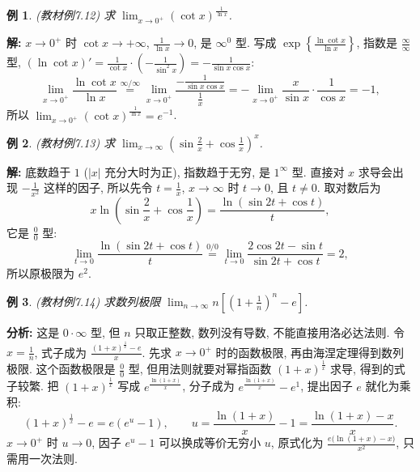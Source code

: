 \documentclass[UTF8,openany]{ctexbook}
\theoremstyle{chinesetextbook}
\newtheorem{example}{例}[section]
\newenvironment{cnsolution}{\par\indent\textbf{解:} \ignorespaces}{\par}
\begin{document}
\begin{example}\label{ex:c2-7-12}
\textnormal{(教材例7.12)} 求 $\displaystyle\lim_{x\to0^+}(\cot x)^{\frac1{\ln x}}$.
\end{example}
\begin{cnsolution}
$x\to0^+$ 时 $\cot x\to+\infty$, $\displaystyle\frac1{\ln x}\to0$, 是 $\infty^0$ 型. 写成 $\displaystyle\exp\left\{\frac{\ln\cot x}{\ln x}\right\}$, 指数是 $\displaystyle\frac\infty\infty$ 型, $\displaystyle(\ln\cot x)'=\frac1{\cot x}\cdot\left(-\frac1{\sin^2x}\right)=-\frac1{\sin x\cos x}$:
\[
\lim_{x\to0^+}\frac{\ln\cot x}{\ln x}\overset{\infty/\infty}{=}\lim_{x\to0^+}\frac{-\frac1{\sin x\cos x}}{\frac1x}=-\lim_{x\to0^+}\frac x{\sin x}\cdot\frac1{\cos x}=-1,
\]
所以 $\displaystyle\lim_{x\to0^+}(\cot x)^{\frac1{\ln x}}=e^{-1}$.
\end{cnsolution}
\begin{example}\label{ex:c2-7-13}
\textnormal{(教材例7.13)} 求 $\displaystyle\lim_{x\to\infty}\left(\sin\frac2x+\cos\frac1x\right)^x$.
\end{example}
\begin{cnsolution}
底数趋于 $1$ ($|x|$ 充分大时为正), 指数趋于无穷, 是 $1^\infty$ 型. 直接对 $x$ 求导会出现 $\displaystyle-\frac1{x^2}$ 这样的因子, 所以先令 $\displaystyle t=\frac1x$, $x\to\infty$ 时 $t\to0$, 且 $t\ne0$. 取对数后为
\[
x\ln\left(\sin\frac2x+\cos\frac1x\right)=\frac{\ln(\sin2t+\cos t)}t,
\]
它是 $\displaystyle\frac00$ 型:
\[
\lim_{t\to0}\frac{\ln(\sin2t+\cos t)}t\overset{0/0}{=}\lim_{t\to0}\frac{2\cos2t-\sin t}{\sin2t+\cos t}=2,
\]
所以原极限为 $e^2$.
\end{cnsolution}
\begin{example}\label{ex:c2-7-14}
\textnormal{(教材例7.14)} 求数列极限 $\displaystyle\lim_{n\to\infty}n\left[\left(1+\frac1n\right)^n-e\right]$.
\end{example}
\par\indent\textbf{分析:} 这是 $0\cdot\infty$ 型, 但 $n$ 只取正整数, 数列没有导数, 不能直接用洛必达法则. 令 $\displaystyle x=\frac1n$, 式子成为 $\displaystyle\frac{(1+x)^{\frac1x}-e}x$. 先求 $x\to0^+$ 时的函数极限, 再由海涅定理得到数列极限. 这个函数极限是 $\displaystyle\frac00$ 型, 但用法则就要对幂指函数 $(1+x)^{\frac1x}$ 求导, 得到的式子较繁. 把 $(1+x)^{\frac1x}$ 写成 $e^{\frac{\ln(1+x)}x}$, 分子成为 $e^{\frac{\ln(1+x)}x}-e^1$, 提出因子 $e$ 就化为乘积:
\[
(1+x)^{\frac1x}-e=e\left(e^u-1\right),\qquad u=\frac{\ln(1+x)}x-1=\frac{\ln(1+x)-x}x.
\]
$x\to0^+$ 时 $u\to0$, 因子 $e^u-1$ 可以换成等价无穷小 $u$, 原式化为 $\displaystyle\frac{e\bigl(\ln(1+x)-x\bigr)}{x^2}$, 只需用一次法则.
\end{document}
